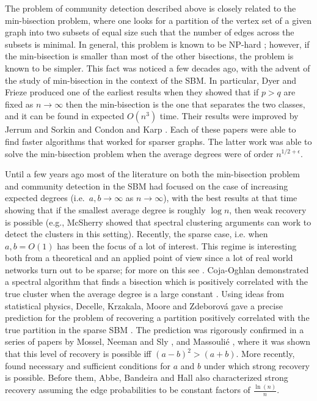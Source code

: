 \documentclass[11pt,reqno]{amsart}
\begin{document}
The problem of community detection described above is closely related
to the min-bisection problem, where one looks for a partition of the
vertex set of a given graph into two subsets of equal size such that
the number of edges across the subsets is minimal. In general, this problem is
known to be NP-hard \cite{GJS76}; however, if the min-bisection is
smaller than most of the other bisections, the problem is known to be
simpler. This fact was noticed a few decades ago, with the advent of
the study of min-bisection in the context of the SBM. In particular, Dyer and Frieze \cite{dyer1989solution} produced one of the earliest results when they showed that if $p > q$ are fixed as $n \to \infty$ then the min-bisection is the one that separates the two classes, and it can be found in expected $O(n^3)$ time.
Their results were improved by Jerrum and Sorkin
\cite{jerrum1998metropolis} and Condon and Karp
\cite{condon2001algorithms}. Each of these papers were able to find
faster algorithms that worked for sparser  graphs. The latter work was
able to solve the min-bisection problem when the average degrees were
of order $n^{1/2+\epsilon}$. %

Until a few years ago most of the literature on both the min-bisection
problem and community detection in the SBM had focused on the case of
increasing expected degrees (i.e.\ $a, b \to \infty$ as $n \to
\infty$), with the best results at that time showing that if the
smallest average degree is roughly $\log n$, then weak recovery is
possible (e.g., McSherry \cite{mcsherry2001spectral} showed that spectral clustering arguments can work to detect the clusters in this setting).
Recently, the sparse case, i.e. when $a, b=O(1)$ has been the focus of
a lot of interest.  This regime is interesting both from a theoretical
and an applied point of view since a lot of real world networks turn
out to be sparse; for more on this see \cite{DLLM08}. 
 Coja-Oghlan demonstrated a spectral algorithm that finds a bisection which is positively correlated with the true cluster when the average degree is a large constant \cite{coja2010graph}.
Using ideas from statistical physics, Decelle, Krzakala, Moore and Zdeborov\'a gave a precise prediction for the problem of recovering a partition positively correlated with the true partition in the sparse SBM \cite{decelle2011}. The prediction was rigorously confirmed in a series of papers by Mossel, Neeman and Sly \cite{MNS12} \cite{MNS13}, and Massouli{\'e}
  \cite{M13}, where it was shown that this level of recovery  is
  possible iff $(a-b)^2>(a+b)$. More recently, \cite{MNS14} found
  necessary and sufficient conditions for $a$ and $b$ under which
  strong recovery is possible. Before them, Abbe, Bandeira and
  Hall  \cite{abbe2014exact} also characterized strong recovery assuming the edge probabilities to be constant factors of $\frac{\ln(n)}{n}$.
\end{document}

